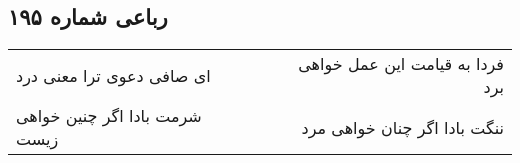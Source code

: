 \begin{center}
\section*{رباعی شماره ۱۹۵}
\label{sec:sh195}
\begin{longtable}{l p{0.5cm} r}
ای صافی دعوی ترا معنی درد
&&
فردا به قیامت این عمل خواهی برد
\\
شرمت بادا اگر چنین خواهی زیست
&&
ننگت بادا اگر چنان خواهی مرد
\\
\end{longtable}
\end{center}
